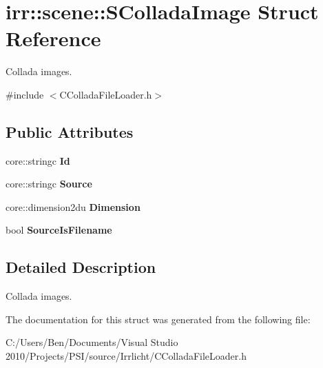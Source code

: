\hypertarget{structirr_1_1scene_1_1_s_collada_image}{\section{irr\-:\-:scene\-:\-:S\-Collada\-Image Struct Reference}
\label{structirr_1_1scene_1_1_s_collada_image}
}


Collada images.  




{\ttfamily \#include $<$C\-Collada\-File\-Loader.\-h$>$}

\subsection*{Public Attributes}
\begin{DoxyCompactItemize}
\item 
\hypertarget{structirr_1_1scene_1_1_s_collada_image_a16f8379db865cd8f26885132fc7fc323}{core\-::stringc {\bfseries Id}}\label{structirr_1_1scene_1_1_s_collada_image_a16f8379db865cd8f26885132fc7fc323}

\item 
\hypertarget{structirr_1_1scene_1_1_s_collada_image_aebd067b04c79205aae6ae9d807202a17}{core\-::stringc {\bfseries Source}}\label{structirr_1_1scene_1_1_s_collada_image_aebd067b04c79205aae6ae9d807202a17}

\item 
\hypertarget{structirr_1_1scene_1_1_s_collada_image_a65a36e800ee90181834d7bc8b19b0e1c}{core\-::dimension2du {\bfseries Dimension}}\label{structirr_1_1scene_1_1_s_collada_image_a65a36e800ee90181834d7bc8b19b0e1c}

\item 
\hypertarget{structirr_1_1scene_1_1_s_collada_image_a5ad7fce9615d44541c4326a3b5c5f8ae}{bool {\bfseries Source\-Is\-Filename}}\label{structirr_1_1scene_1_1_s_collada_image_a5ad7fce9615d44541c4326a3b5c5f8ae}

\end{DoxyCompactItemize}


\subsection{Detailed Description}
Collada images. 

The documentation for this struct was generated from the following file\-:\begin{DoxyCompactItemize}
\item 
C\-:/\-Users/\-Ben/\-Documents/\-Visual Studio 2010/\-Projects/\-P\-S\-I/source/\-Irrlicht/C\-Collada\-File\-Loader.\-h\end{DoxyCompactItemize}
